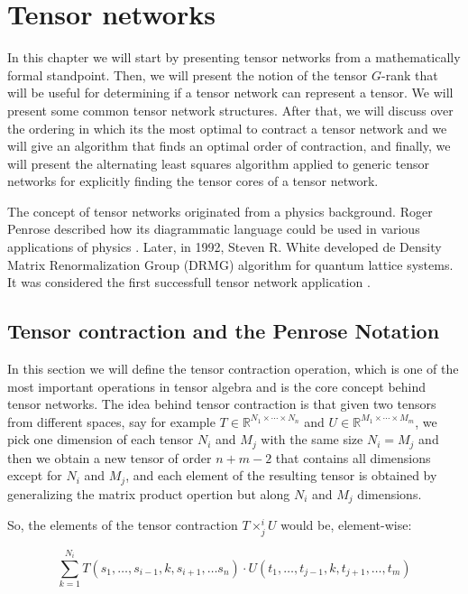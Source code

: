 \documentclass[11pt,a4paper,openright,oneside]{book}
\numberwithin{equation}{section}
\begin{document}
\chapter{Tensor networks}

In this chapter we will start by presenting tensor networks from a mathematically formal standpoint. Then, we will present the notion
of the tensor $G$-rank that will be useful for determining if a tensor network can represent a tensor. We will present some common
tensor network structures. After that, we will discuss over the ordering in which its the most optimal to contract a tensor network
and we will give an algorithm that finds an optimal order of contraction, and finally, we will present the alternating least
squares algorithm applied to generic tensor networks for explicitly finding the tensor cores of a tensor network.

The concept of tensor networks originated from a physics background. Roger Penrose described how its
diagrammatic language could be used in various applications of physics \cite{rogerPenroseApplications}. Later, 
in 1992, Steven R. White developed de Density Matrix Renormalization Group (DRMG) algorithm for
quantum lattice systems. It was considered the first successfull tensor network application \cite{whiteDensityMatrixFormulation1992}.



\section{Tensor contraction and the Penrose Notation}

In this section we will define the tensor contraction operation, which is one of the most important operations
in tensor algebra and is the core concept behind tensor networks.
The idea behind tensor contraction is that given two tensors from different spaces, say for example
$T \in \mathbb{R}^{N_1 \times \cdots \times N_n}$ and $U \in \mathbb{R}^{M_1 \times \cdots \times M_m}$, we pick one dimension of
each tensor $N_i$ and $M_j$ with the same size $N_i = M_j$ and then we obtain a new tensor of order $n + m - 2$ that contains all dimensions except for $N_i$ and $M_j$, and
each element of the resulting tensor is obtained by generalizing the matrix product opertion but along $N_i$ and $M_j$ dimensions.

So, the elements of the tensor contraction $T \times^i_j U$ would be, element-wise:

$$\sum_{k = 1}^{N_i} T(s_1, \dots, s_{i-1}, k, s_{i+1}, \dots s_n) \cdot U(t_1, \dots, t_{j-1}, k, t_{j+1}, \dots, t_m) $$
\end{document}
